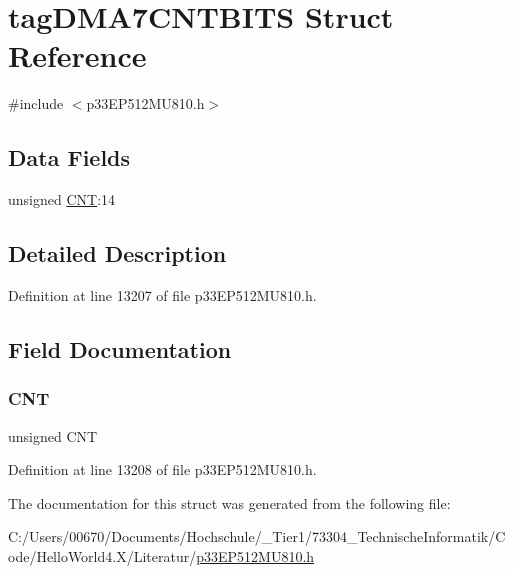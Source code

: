 \hypertarget{structtag_d_m_a7_c_n_t_b_i_t_s}{}\section{tag\+D\+M\+A7\+C\+N\+T\+B\+I\+TS Struct Reference}
\label{structtag_d_m_a7_c_n_t_b_i_t_s}


{\ttfamily \#include $<$p33\+E\+P512\+M\+U810.\+h$>$}

\subsection*{Data Fields}
\begin{DoxyCompactItemize}
\item 
unsigned \hyperlink{structtag_d_m_a7_c_n_t_b_i_t_s_a30be39d82c244f19fd98dd74227487f6}{C\+NT}\+:14
\end{DoxyCompactItemize}


\subsection{Detailed Description}


Definition at line 13207 of file p33\+E\+P512\+M\+U810.\+h.



\subsection{Field Documentation}
\mbox{\label{structtag_d_m_a7_c_n_t_b_i_t_s_a30be39d82c244f19fd98dd74227487f6}} 
\subsubsection{\texorpdfstring{C\+NT}{CNT}}
{\footnotesize\ttfamily unsigned C\+NT}



Definition at line 13208 of file p33\+E\+P512\+M\+U810.\+h.



The documentation for this struct was generated from the following file\+:\begin{DoxyCompactItemize}
\item 
C\+:/\+Users/00670/\+Documents/\+Hochschule/\+\_\+\+Tier1/73304\+\_\+\+Technische\+Informatik/\+Code/\+Hello\+World4.\+X/\+Literatur/\hyperlink{p33_e_p512_m_u810_8h}{p33\+E\+P512\+M\+U810.\+h}\end{DoxyCompactItemize}
